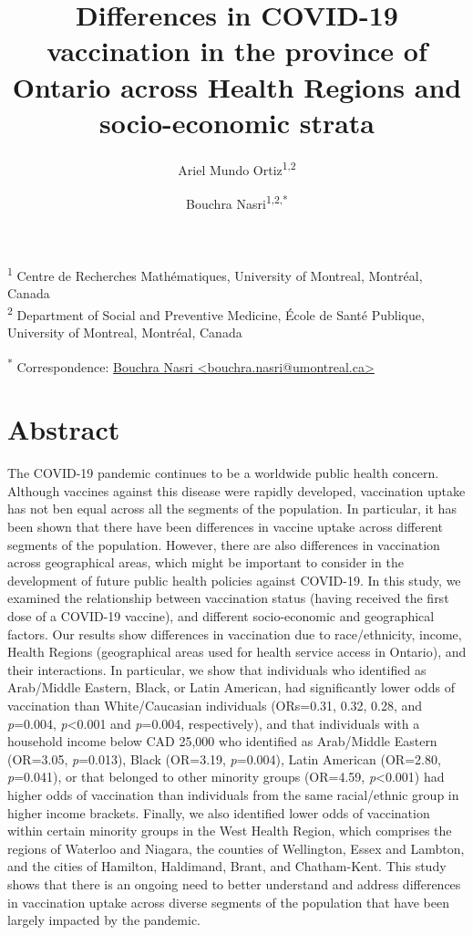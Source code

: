 \documentclass[
  letterpaper,
  DIV=11,
  numbers=noendperiod]{scrartcl}
\title{\textbf{Differences in COVID-19 vaccination in the province of
Ontario across Health Regions and socio-economic strata}}
\author{Ariel Mundo Ortiz\textsuperscript{1,2} \and Bouchra
Nasri\textsuperscript{1,2,*}}
\date{}
\begin{document}
\maketitle
\ifdefined\Shaded\renewenvironment{Shaded}{\begin{tcolorbox}[sharp corners, breakable, interior hidden, borderline west={3pt}{0pt}{shadecolor}, frame hidden, enhanced, boxrule=0pt]}{\end{tcolorbox}}\fi

\textsuperscript{1} Centre de Recherches Mathématiques, University of
Montreal, Montréal, Canada\\
\textsuperscript{2} Department of Social and Preventive Medicine, École
de Santé Publique, University of Montreal, Montréal, Canada

\textsuperscript{*} Correspondence:
\href{mailto:bouchra.nasri@umontreal.ca}{Bouchra Nasri
\textless{}bouchra.nasri@umontreal.ca\textgreater{}}

\hypertarget{abstract}{%
\section{Abstract}\label{abstract}}

The COVID-19 pandemic continues to be a worldwide public health concern.
Although vaccines against this disease were rapidly developed,
vaccination uptake has not ben equal across all the segments of the
population. In particular, it has been shown that there have been
differences in vaccine uptake across different segments of the
population. However, there are also differences in vaccination across
geographical areas, which might be important to consider in the
development of future public health policies against COVID-19. In this
study, we examined the relationship between vaccination status (having
received the first dose of a COVID-19 vaccine), and different
socio-economic and geographical factors. Our results show differences in
vaccination due to race/ethnicity, income, Health Regions (geographical
areas used for health service access in Ontario), and their
interactions. In particular, we show that individuals who identified as
Arab/Middle Eastern, Black, or Latin American, had significantly lower
odds of vaccination than White/Caucasian individuals (ORs=0.31, 0.32,
0.28, and \emph{p}=0.004, \emph{p}\textless0.001 and \emph{p}=0.004,
respectively), and that individuals with a household income below CAD
25,000 who identified as Arab/Middle Eastern (OR=3.05, \emph{p}=0.013),
Black (OR=3.19, \emph{p}=0.004), Latin American (OR=2.80,
\emph{p}=0.041), or that belonged to other minority groups (OR=4.59,
\emph{p}\textless0.001) had higher odds of vaccination than individuals
from the same racial/ethnic group in higher income brackets. Finally, we
also identified lower odds of vaccination within certain minority groups
in the West Health Region, which comprises the regions of Waterloo and
Niagara, the counties of Wellington, Essex and Lambton, and the cities
of Hamilton, Haldimand, Brant, and Chatham-Kent. This study shows that
there is an ongoing need to better understand and address differences in
vaccination uptake across diverse segments of the population that have
been largely impacted by the pandemic.
\end{document}
